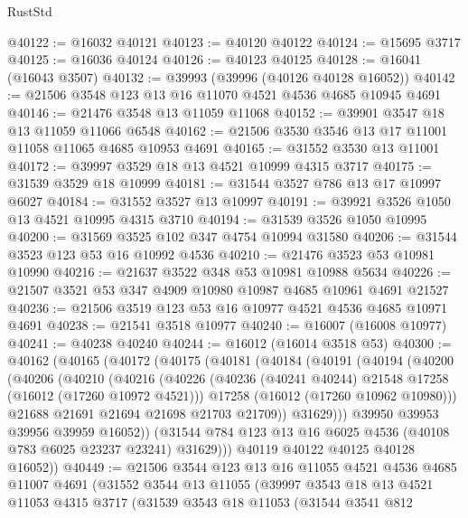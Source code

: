 \begin{lexlean}{RustStd}
\begin{coremodule}
@40122 := @16032 @40121
@40123 := @40120 @40122
@40124 := @15695 @3717
@40125 := @16036 @40124
@40126 := @40123 @40125
@40128 := @16041 (@16043 @3507)
@40132 := @39993 (@39996 (@40126 @40128 @16052))
@40142 := @21506 @3548 @123 @13 @16 @11070 @4521 @4536 @4685 @10945 @4691
@40146 := @21476 @3548 @13 @11059 @11068
@40152 := @39901 @3547 @18 @13 @11059 @11066 @6548
@40162 := @21506 @3530 @3546 @13 @17 @11001 @11058 @11065 @4685 @10953 @4691
@40165 := @31552 @3530 @13 @11001
@40172 := @39997 @3529 @18 @13 @4521 @10999 @4315 @3717
@40175 := @31539 @3529 @18 @10999
@40181 := @31544 @3527 @786 @13 @17 @10997 @6027
@40184 := @31552 @3527 @13 @10997
@40191 := @39921 @3526 @1050 @13 @4521 @10995 @4315 @3710
@40194 := @31539 @3526 @1050 @10995
@40200 := @31569 @3525 @102 @347 @4754 @10994 @31580
@40206 := @31544 @3523 @123 @53 @16 @10992 @4536
@40210 := @21476 @3523 @53 @10981 @10990
@40216 := @21637 @3522 @348 @53 @10981 @10988 @5634
@40226 := @21507 @3521 @53 @347 @4909 @10980 @10987 @4685 @10961 @4691 @21527
@40236 := @21506 @3519 @123 @53 @16 @10977 @4521 @4536 @4685 @10971 @4691
@40238 := @21541 @3518 @10977
@40240 := @16007 (@16008 @10977)
@40241 := @40238 @40240
@40244 := @16012 (@16014 @3518 @53)
@40300 := @40162
    (@40165
      (@40172
        (@40175
          (@40181
            (@40184
              (@40191
                (@40194
                  (@40200
                    (@40206
                      (@40210
                        (@40216
                          (@40226
                            (@40236 (@40241 @40244) @21548 @17258 (@16012 (@17260 @10972 @4521)))
                            @17258
                            (@16012 (@17260 @10962 @10980)))
                          @21688
                          @21691
                          @21694
                          @21698
                          @21703
                          @21709))
                      @31629)))
                @39950
                @39953
                @39956
                @39959
                @16052))
            (@31544 @784 @123 @13 @16 @6025 @4536 (@40108 @783 @6025 @23237 @23241) @31629)))
        @40119
        @40122
        @40125
        @40128
        @16052))
@40449 := @21506
    @3544
    @123
    @13
    @16
    @11055
    @4521
    @4536
    @4685
    @11007
    @4691
    (@31552
      @3544
      @13
      @11055
      (@39997
        @3543
        @18
        @13
        @4521
        @11053
        @4315
        @3717
        (@31539
          @3543
          @18
          @11053
          (@31544
            @3541
            @812

\end{coremodule}
\end{lexlean}
